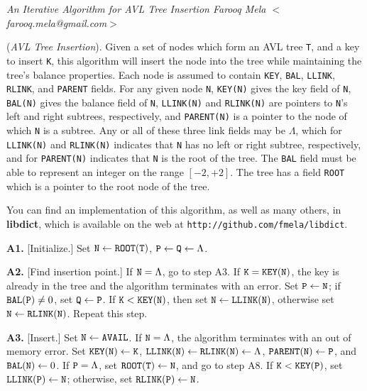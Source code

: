 \nopagenumbers
\parskip=2pt
\parindent=0pt

{\sl An Iterative Algorithm for AVL Tree Insertion
	\hfill \rm Farooq Mela $<$farooq.mela@gmail.com$>$}

\medskip

 ({\it AVL Tree Insertion}).
Given a set of nodes which form an AVL tree {\tt T}, and a key to insert
{\tt K}, this algorithm will insert the node into the tree while maintaining
the tree's balance properties. Each node is assumed to contain {\tt KEY},
{\tt BAL}, {\tt LLINK}, {\tt RLINK}, and {\tt PARENT} fields. For any given
node {\tt N}, {\tt KEY(N)} gives the key field of {\tt N}, {\tt BAL(N)} gives
the balance field of {\tt N}, {\tt LLINK(N)} and {\tt RLINK(N)} are pointers to
{\tt N}'s left and right subtrees, respectively, and {\tt PARENT(N)} is a
pointer to the node of which {\tt N} is a subtree. Any or all of these three
link fields may be $\Lambda$, which for {\tt LLINK(N)} and {\tt RLINK(N)}
indicates that {\tt N} has no left or right subtree, respectively, and for
{\tt PARENT(N)} indicates that {\tt N} is the root of the tree. The {\tt BAL}
field must be able to represent an integer on the range $[-2, +2]$. The tree
has a field {\tt ROOT} which is a pointer to the root node of the tree.

\medskip
You can find an implementation of this algorithm, as well as many others, in
{\bf libdict}, which is available on the web at
{\tt http://github.com/fmela/libdict}.
\medskip

\parindent=36pt

\item{\bf A1.} [Initialize.]
Set ${\tt N} \gets {\tt ROOT(T)}$, ${\tt P} \gets {\tt Q}\gets \Lambda$.

\item{\bf A2.} [Find insertion point.]
If ${\tt N} = \Lambda$, go to step A3.
If ${\tt K} = {\tt KEY(N)}$,
the key is already in the tree and the algorithm terminates with an error.
Set ${\tt P} \gets {\tt N}$;
if ${\tt BAL(P)} \neq 0$, set ${\tt Q} \gets {\tt P}$.
If ${\tt K} < {\tt KEY(N)}$,
then set ${\tt N} \gets {\tt LLINK(N)}$,
otherwise set ${\tt N} \gets {\tt RLINK(N)}$. Repeat this step.

\item{\bf A3.} [Insert.]
Set ${\tt N} \gets {\tt AVAIL}$.
If ${\tt N} = \Lambda$, the algorithm terminates with an out of memory error.
Set ${\tt KEY(N)} \gets {\tt K}$,
${\tt LLINK(N)} \gets {\tt RLINK(N)} \gets \Lambda$,
${\tt PARENT(N)} \gets {\tt P}$, and
${\tt BAL(N)} \gets 0$.
If ${\tt P} = \Lambda$, set ${\tt ROOT(T)} \gets {\tt N}$, and go to step A8.
If ${\tt K} < {\tt KEY(P)}$,
set ${\tt LLINK(P)} \gets {\tt N}$; otherwise,
set ${\tt RLINK(P)} \gets {\tt N}$.

